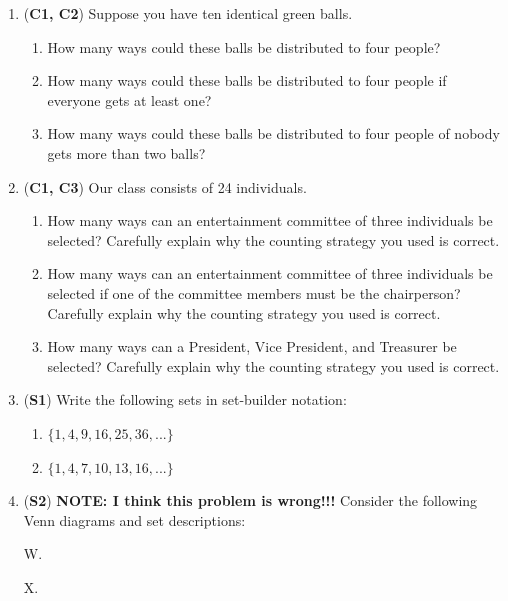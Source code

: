 \documentclass[12pt]{article}
\def\firstcircle{(90:1cm) circle (1.5cm)}
\def\secondcircle{(210:1cm) circle (1.5cm)}
\def\thirdcircle{(330:1cm) circle (1.5cm)}
\def\universer{(-3, -2.5) rectangle (3, 2.75)}
\begin{document}
\begin{enumerate}
\item (\textbf{C1, C2}) Suppose you have ten identical green balls. 

\begin{enumerate}
    \item How many ways could these balls be distributed to four people?
    \item How many ways could these balls be distributed to four people if everyone gets at least one?
    \item How many ways could these balls be distributed to four people of nobody gets more than two balls?
\end{enumerate}


\item (\textbf{C1, C3}) Our class consists of 24 individuals. 
\begin{enumerate}
    \item How many ways can an entertainment committee of three individuals be selected? Carefully explain why the counting strategy you used is correct.
    \item How many ways can an entertainment committee of three individuals be selected if one of the committee members must be the chairperson? Carefully explain why the counting strategy you used is correct.
    \item How many ways can a President, Vice President, and Treasurer be selected? Carefully explain why the counting strategy you used is correct.
 \end{enumerate}
 
\item (\textbf{S1}) Write the following sets in set-builder notation: 

\begin{enumerate}
    \item $\{1, 4, 9, 16, 25, 36, ... \}$
    \item $\{1, 4, 7, 10, 13, 16, ... \}$
\end{enumerate}


\item (\textbf{S2}) \textbf{NOTE: I think this problem is wrong!!!} Consider the following Venn diagrams and set descriptions: 

W. 
\hfill
X. 
\hfill\, %


\end{enumerate}
\end{document}
